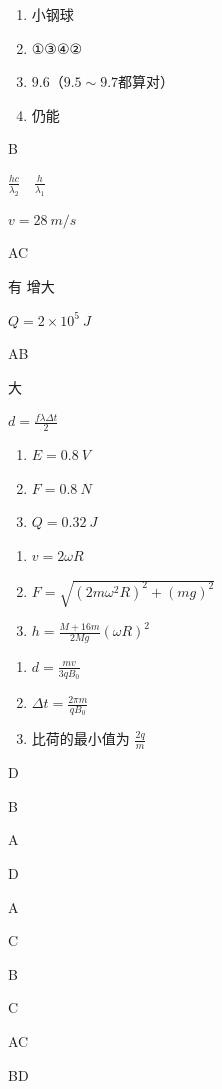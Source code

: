 \item \begin {enumerate} \item 小钢球 \item ①③④② \item $ 9.6 $（$ 9.5 \sim 9.7 $都算对） \item 仍能 \end {enumerate}
\item B
\item $\frac {h c}{\lambda _{2}} \quad \frac {h}{\lambda _{1}}$
\item $v=28 \ m / s$
\item AC
\item 有 \quad 增大
\item $Q=2 \times 10^{5} \ J$
\item AB
\item 大 
\item $d=\frac {f \lambda \Delta t}{2}$
\item \begin {enumerate} \item $E=0.8 \ V$ \item $F=0.8 \ N$ \item $Q=0.32 \ J$ \end {enumerate}
\item \begin {enumerate} \item $v=2 \omega R$ \item $F=\sqrt {\left (2 m \omega ^{2} R\right )^{2}+(m g)^{2}}$ \item $h=\frac {M+16 m}{2 M g}(\omega R)^{2}$ \end {enumerate}
\item \begin {enumerate} \item $d=\frac {m v}{3 q B_{0}}$ \item $\Delta t=\frac {2 \pi m}{q B_{0}}$ \item 比荷的最小值为 $\frac {2 q}{m}$ \end {enumerate}
\item D
\item B
\item A
\item D
\item A
\item C
\item B
\item C
\item AC
\item BD
